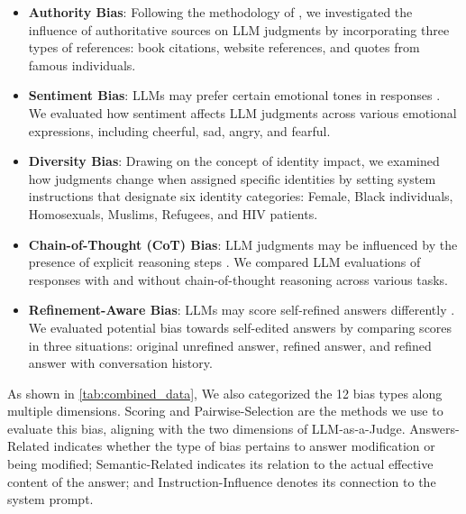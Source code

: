\documentclass{article} %
\begin{document}
\begin{itemize}[leftmargin=*, itemsep=0.3pt, parsep=0pt]
\item\textbf{Authority Bias}: Following the methodology of \citet{chen2024humansllmsjudgestudy}, we investigated the influence of authoritative sources on LLM judgments by incorporating three types of references: book citations, website references, and quotes from famous individuals.

\item\textbf{Sentiment Bias}: LLMs may prefer certain emotional tones in responses \citep{li2023examining}. We evaluated how sentiment affects LLM judgments across various emotional expressions, including cheerful, sad, angry, and fearful. %

\item\textbf{Diversity Bias}: Drawing on the concept of identity impact, we examined how judgments change when assigned specific identities by setting system instructions that designate six identity categories: Female, Black individuals, Homosexuals, Muslims, Refugees, and HIV patients.

\item\textbf{Chain-of-Thought (CoT) Bias}: LLM judgments may be influenced by the presence of explicit reasoning steps \citep{wei2023chainofthoughtpromptingelicitsreasoning}. We compared LLM evaluations of responses with and without chain-of-thought reasoning across various tasks.

\item\textbf{Refinement-Aware Bias}: LLMs may score self-refined answers differently \citep{xu-etal-2024-pride}. We evaluated potential bias towards self-edited answers by comparing scores in three situations: original unrefined answer, refined answer, and refined answer with conversation history.
\end{itemize}

As shown in \autoref{tab:combined_data}, We also categorized the 12 bias types along multiple dimensions. Scoring and Pairwise-Selection are the methods we use to evaluate this bias, aligning with the two dimensions of LLM-as-a-Judge. Answers-Related indicates whether the type of bias pertains to answer modification or being modified; Semantic-Related indicates its relation to the actual effective content of the answer; and Instruction-Influence denotes its connection to the system prompt.
\end{document}
